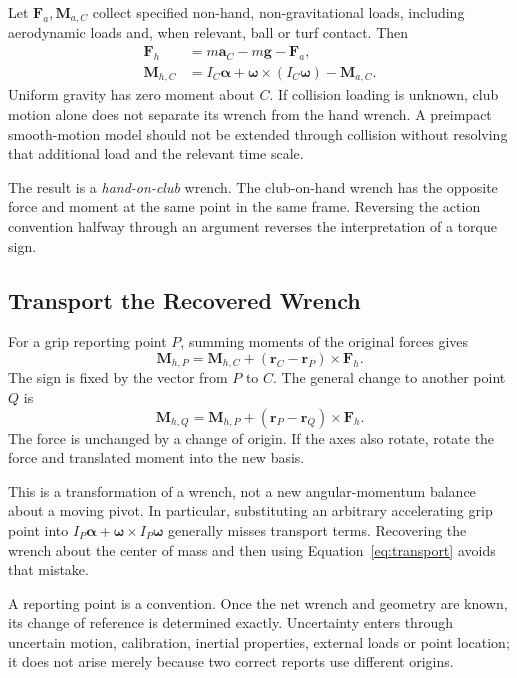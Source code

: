 \documentclass[11pt,a4paper]{article}
\newcommand{\vect}[1]{\boldsymbol{#1}}
\begin{document}
Let $\vect F_a,\vect M_{a,C}$ collect specified non-hand, non-gravitational loads, including aerodynamic loads and, when relevant, ball or turf contact. Then
\begin{align}
\vect F_h&=m\vect a_C-m\vect g-\vect F_a,\label{eq:handforce}\\
\vect M_{h,C}&=I_C\vect\alpha+
\vect\omega\times(I_C\vect\omega)-\vect M_{a,C}.\label{eq:handmoment}
\end{align}
Uniform gravity has zero moment about $C$. If collision loading is unknown, club motion alone does not separate its wrench from the hand wrench. A preimpact smooth-motion model should not be extended through collision without resolving that additional load and the relevant time scale.

The result is a \emph{hand-on-club} wrench. The club-on-hand wrench has the opposite force and moment at the same point in the same frame. Reversing the action convention halfway through an argument reverses the interpretation of a torque sign.

\subsection{Transport the Recovered Wrench}
For a grip reporting point $P$, summing moments of the original forces gives
\begin{equation}
\vect M_{h,P}=\vect M_{h,C}+(\vect r_C-\vect r_P)\times\vect F_h.
\label{eq:transport}
\end{equation}
The sign is fixed by the vector from $P$ to $C$. The general change to another point $Q$ is
\begin{equation}
\vect M_{h,Q}=\vect M_{h,P}+(\vect r_P-\vect r_Q)\times\vect F_h.
\label{eq:couple_transform}
\end{equation}
The force is unchanged by a change of origin. If the axes also rotate, rotate the force and translated moment into the new basis.

This is a transformation of a wrench, not a new angular-momentum balance about a moving pivot. In particular, substituting an arbitrary accelerating grip point into $I_P\vect\alpha+\vect\omega\times I_P\vect\omega$ generally misses transport terms. Recovering the wrench about the center of mass and then using Equation~\ref{eq:transport} avoids that mistake.

\begin{keypoint}
A reporting point is a convention. Once the net wrench and geometry are known, its change of reference is determined exactly. Uncertainty enters through uncertain motion, calibration, inertial properties, external loads or point location; it does not arise merely because two correct reports use different origins.
\end{keypoint}
\end{document}
